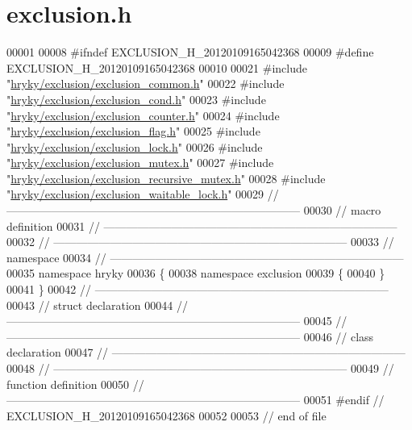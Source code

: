 \hypertarget{exclusion_8h_source}{\section{exclusion.\-h}
}

\begin{DoxyCode}
00001 
00008 \textcolor{preprocessor}{#ifndef EXCLUSION\_H\_20120109165042368}
00009 \textcolor{preprocessor}{}\textcolor{preprocessor}{#define EXCLUSION\_H\_20120109165042368}
00010 \textcolor{preprocessor}{}
00021 \textcolor{preprocessor}{#include "\hyperlink{exclusion__common_8h}{hryky/exclusion/exclusion_common.h}"}
00022 \textcolor{preprocessor}{#include "\hyperlink{exclusion__cond_8h}{hryky/exclusion/exclusion_cond.h}"}
00023 \textcolor{preprocessor}{#include "\hyperlink{exclusion__counter_8h}{hryky/exclusion/exclusion_counter.h}"}
00024 \textcolor{preprocessor}{#include "\hyperlink{exclusion__flag_8h}{hryky/exclusion/exclusion_flag.h}"}
00025 \textcolor{preprocessor}{#include "\hyperlink{exclusion__lock_8h}{hryky/exclusion/exclusion_lock.h}"}
00026 \textcolor{preprocessor}{#include "\hyperlink{exclusion__mutex_8h}{hryky/exclusion/exclusion_mutex.h}"}
00027 \textcolor{preprocessor}{#include "\hyperlink{exclusion__recursive__mutex_8h}{hryky/exclusion/exclusion_recursive_mutex.h}"}
00028 \textcolor{preprocessor}{#include "\hyperlink{exclusion__waitable__lock_8h}{hryky/exclusion/exclusion_waitable_lock.h}"}
00029 \textcolor{comment}{//
      ------------------------------------------------------------------------------}
00030 \textcolor{comment}{// macro definition}
00031 \textcolor{comment}{//
      ------------------------------------------------------------------------------}
00032 \textcolor{comment}{//
      ------------------------------------------------------------------------------}
00033 \textcolor{comment}{// namespace}
00034 \textcolor{comment}{//
      ------------------------------------------------------------------------------}
00035 \textcolor{keyword}{namespace }hryky
00036 \{
00038 \textcolor{keyword}{namespace }exclusion
00039 \{
00040 \}
00041 \}
00042 \textcolor{comment}{//
      ------------------------------------------------------------------------------}
00043 \textcolor{comment}{// struct declaration}
00044 \textcolor{comment}{//
      ------------------------------------------------------------------------------}
00045 \textcolor{comment}{//
      ------------------------------------------------------------------------------}
00046 \textcolor{comment}{// class declaration}
00047 \textcolor{comment}{//
      ------------------------------------------------------------------------------}
00048 \textcolor{comment}{//
      ------------------------------------------------------------------------------}
00049 \textcolor{comment}{// function definition}
00050 \textcolor{comment}{//
      ------------------------------------------------------------------------------}
00051 \textcolor{preprocessor}{#endif // EXCLUSION\_H\_20120109165042368}
00052 \textcolor{preprocessor}{}
00053 \textcolor{comment}{// end of file}
\end{DoxyCode}
